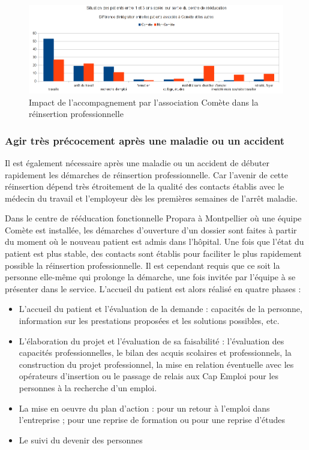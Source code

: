 \begin{figure}[H]
\includegraphics[scale=0.6]{figures/difference_integration.png}
\centering
\caption{Impact de l'accompagnement par l'association Comète dans la réinsertion professionnelle}
\end{figure}




\subsubsection{Agir très précocement après une maladie ou un accident}

Il est également nécessaire après une maladie ou un accident de débuter rapidement les démarches de réinsertion professionnelle. Car l'avenir de cette réinsertion dépend très étroitement de la qualité des contacts établis avec le médecin du travail et l'employeur dès les premières semaines de l'arr\^et maladie.

Dans le centre de rééducation fonctionnelle Propara à Montpellier où une équipe Comète est installée, les démarches d'ouverture d'un dossier sont faites à partir du moment où le nouveau patient est admis dans l'h\^opital. Une fois que l'état du patient est plus stable, des contacts sont établis pour faciliter le plus rapidement possible la réinsertion professionnelle. Il est cependant requis que ce soit la personne elle-même qui prolonge la démarche, une fois invitée par l'équipe à se présenter dans le service. L'accueil du patient est alors réalisé en quatre phases :
\begin{itemize}
\item L'accueil du patient et l'évaluation de la demande : capacités de la personne, information sur les prestations proposées et les solutions possibles, etc.
\item L'élaboration du projet et l'évaluation de sa faisabilité : l'évaluation des capacités professionnelles, le bilan des acquis scolaires et professionnels, la construction du projet professionnel, la mise en relation éventuelle avec les opérateurs d'insertion ou le passage de relais aux Cap Emploi pour les personnes à la recherche d'un emploi.
\item La mise en oeuvre du plan d'action : pour un retour à l'emploi dans l'entreprise ; pour une reprise de formation ou pour une reprise d'études
\item Le suivi du devenir des personnes\\
\end{itemize}
